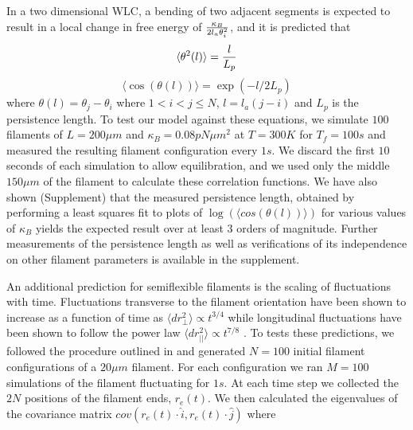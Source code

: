 \documentclass[12pt]{article}
\begin{document}
In a two dimensional WLC, a bending of two adjacent segments is expected to result in a local change in free energy of ${\kappa_B\over2l_a\theta_i^2}$, and it is predicted that \cite{frontali1979}
\begin{equation}
  \langle\theta^2(l)\rangle = {l\over L_p}
  \label{eqn:thsq}
\end{equation}
\begin{equation} 
  \langle\cos(\theta(l))\rangle = \exp{(-l/2L_p)}
  \label{eqn:costh}
\end{equation} 
where $\theta(l) = \theta_j - \theta_i$ where $1<i<j\le N$, $l = l_a(j-i)$ and $L_p$ is the persistence length. To test our model against these equations, we simulate $100$ filaments of $L=200\mu m$ and $\kappa_B=0.08 pN\mu m^2$ at $T=300K$ for $T_f = 100s$ and measured the resulting filament configuration every $1s$. We discard the first $10$ seconds of each simulation to allow equilibration, and we used only the middle $150 \mu m$ of the filament to calculate these correlation functions.
We have also shown (Supplement) that the measured persistence length, obtained by performing a least squares fit to
plots of $\log{(\langle cos(\theta(l))\rangle )} $ for various values of $\kappa_B$ yields the expected result over at
least $3$ orders of magnitude. Further measurements of the persistence length as well as verifications of its
independence on other filament parameters is available in the supplement.
\par
An additional prediction for semiflexible filaments is the scaling of fluctuations with time. 
Fluctuations transverse to the filament orientation have been 
shown to increase as a function of time as $\langle dr_{\perp}^2\rangle\propto t^{3/4}$ while longitudinal fluctuations have been shown to follow the power law
$\langle dr_{||}^2\rangle\propto t^{7/8}$ \cite{everaers1999}. To tests these predictions, we followed the procedure outlined in
\cite{everaers1999} and generated $N = 100$ initial filament configurations of a $20\mu m$ filament. For each configuration we ran $M = 100$ simulations of the filament fluctuating for $1s$. At each time step we collected the $2N$ positions of the filament ends, $r_e(t)$. We then calculated the eigenvalues of the covariance matrix $cov(r_e(t)\cdot \hat{i},r_e(t)\cdot \hat{j})$ where
\end{document}
